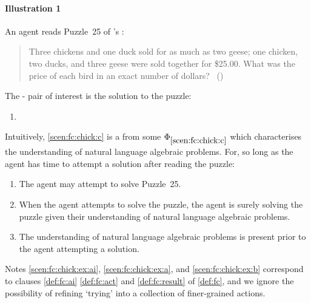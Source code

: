\paragraph{Illustration 1}


\begin{note}
  \begin{scenario}[Paltry]
    \label{scen:fc:chick}%
    An agent reads Puzzle~25 of \citeauthor{Dudeney:1995aa}'s :
    \begin{quote}
      Three chickens and one duck sold for as much as two geese; one chicken, two ducks, and three geese were sold together for \$25.00. What was the price of each bird in an exact number of dollars?%
      \mbox{ }\hfill\mbox{(\citeyear[9]{Dudeney:1995aa})}
    \end{quote}
    \vspace{-\baselineskip}
  \end{scenario}

  \noindent%
  The - pair of interest is the solution to the puzzle:
  \begin{enumerate}[label=C\thescenarioCounter., ref=C\thescenarioCounter]
  \item
    \label{scen:fc:chick:c}
  \end{enumerate}
  Intuitively, \ref{scen:fc:chick:c} is a \fc{} from some \pool{} \(\Phi_{\ref{scen:fc:chick:c}}\) which characterises the \agents{} understanding of natural language algebraic problems.
  For, so long as the agent has time to attempt a solution after reading the puzzle:
  \begin{enumerate}[label=\alph*., ref=\alph*]
  \item
    \label{scen:fc:chick:ex:ai}
    The agent may attempt to solve Puzzle~25.
  \item
    \label{scen:fc:chick:ex:a}
    When the agent attempts to solve the puzzle, the agent is surely solving the puzzle given their understanding of natural language algebraic problems.
  \item
    \label{scen:fc:chick:ex:b}
    The \agents{} understanding of natural language algebraic problems is present prior to the agent attempting a solution.
  \end{enumerate}
  Notes \ref{scen:fc:chick:ex:ai}, \ref{scen:fc:chick:ex:a}, and \ref{scen:fc:chick:ex:b} correspond to clauses \ref{def:fc:ai} \ref{def:fc:act} and \ref{def:fc:result} of \autoref{def:fc}, and we ignore the possibility of refining `trying' into a collection of finer-grained actions.
\end{note}


